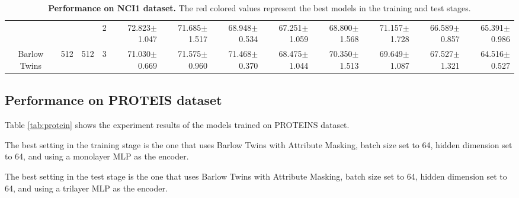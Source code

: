 \begin{table}[htpb]
{\begin{tabular}{c|c|c|c|rr|rr|rr|rr}
                                 &                                                                                 &                                                                                        & 2                                                                                         & 72.823$\pm$1.047                        & 71.685$\pm$1.517                        & 68.948$\pm$0.534                        & 67.251$\pm$1.059                        & 68.800$\pm$1.568                        & 71.157$\pm$1.728                        & 66.589$\pm$0.857                        & 65.391$\pm$0.986                       \\
\multirow{-12}{*}{Barlow Twins}  & \multirow{-6}{*}{512}                                                           & \multirow{-3}{*}{512}                                                                  & 3                                                                                         & 71.030$\pm$0.669                        & 71.575$\pm$0.960                        & 71.468$\pm$0.370                        & 68.475$\pm$1.044                        & 70.350$\pm$1.513                        & 69.649$\pm$1.087                        & 67.527$\pm$1.321                        & 64.516$\pm$0.527                       \\ \hline
\end{tabular}
}
    \caption[Performance on NCI1 dataset]{ \textbf{Performance on NCI1 dataset.} The red colored values represent the best models in the training and test stages.}
    \label{tab:nci1}
\end{table}


\subsection{Performance on PROTEIS dataset}

Table \ref{tab:protein} shows the experiment results of the models trained on PROTEINS dataset. 


The best setting in the training stage is the one that uses Barlow Twins with Attribute Masking, batch size set to 64, hidden dimension set to 64, and using a monolayer MLP as the encoder.

The best setting in the test stage is the one that uses Barlow Twins with Attribute Masking, batch size set to 64, hidden dimension set to 64, and using a trilayer MLP as the encoder.


